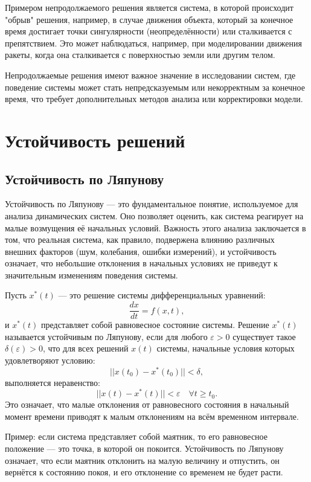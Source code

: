 \documentclass[a4paper,14pt]{extarticle} %
\begin{document}
Примером непродолжаемого решения является система, в которой происходит "обрыв" решения, например, в случае движения объекта, который за конечное время достигает точки сингулярности (неопределённости) или сталкивается с препятствием. Это может наблюдаться, например, при моделировании движения ракеты, когда она сталкивается с поверхностью земли или другим телом.

Непродолжаемые решения имеют важное значение в исследовании систем, где поведение системы может стать непредсказуемым или некорректным за конечное время, что требует дополнительных методов анализа или корректировки модели.

\newpage
\section{Устойчивость решений}

\subsection{Устойчивость по Ляпунову}
Устойчивость по Ляпунову — это фундаментальное понятие, используемое для анализа динамических систем. Оно позволяет оценить, как система реагирует на малые возмущения её начальных условий. Важность этого анализа заключается в том, что реальная система, как правило, подвержена влиянию различных внешних факторов (шум, колебания, ошибки измерений), и устойчивость означает, что небольшие отклонения в начальных условиях не приведут к значительным изменениям поведения системы.

Пусть \( x^*(t) \) — это решение системы дифференциальных уравнений:
\[
\frac{dx}{dt} = f(x, t),
\]
и \( x^*(t) \) представляет собой равновесное состояние системы. Решение \( x^*(t) \) называется устойчивым по Ляпунову, если для любого \( \varepsilon > 0 \) существует такое \( \delta(\varepsilon) > 0 \), что для всех решений \( x(t) \) системы, начальные условия которых удовлетворяют условию:
\[
||x(t_0) - x^*(t_0)|| < \delta,
\]
выполняется неравенство:
\[
||x(t) - x^*(t)|| < \varepsilon \quad \forall t \geq t_0.
\]
Это означает, что малые отклонения от равновесного состояния в начальный момент времени приводят к малым отклонениям на всём временном интервале.

Пример: если система представляет собой маятник, то его равновесное положение — это точка, в которой он покоится. Устойчивость по Ляпунову означает, что если маятник отклонить на малую величину и отпустить, он вернётся к состоянию покоя, и его отклонение со временем не будет расти.
\end{document}
